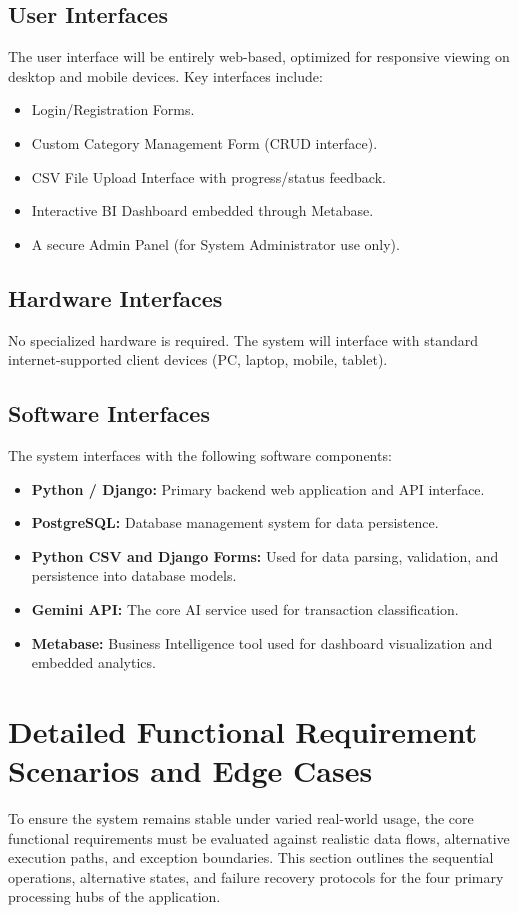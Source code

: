 \subsection{User Interfaces}
The user interface will be entirely web-based, optimized for responsive viewing on desktop and mobile devices. Key interfaces include:
\begin{itemize}
	\item Login/Registration Forms.
	\item Custom Category Management Form (CRUD interface).
	\item CSV File Upload Interface with progress/status feedback.
	\item Interactive BI Dashboard embedded through Metabase.
	\item A secure Admin Panel (for System Administrator use only).
\end{itemize}

\subsection{Hardware Interfaces}
No specialized hardware is required. The system will interface with standard internet-supported client devices (PC, laptop, mobile, tablet).

\subsection{Software Interfaces}
The system interfaces with the following software components:
\begin{itemize}
	\item \textbf{Python / Django:} Primary backend web application and API interface.
	\item \textbf{PostgreSQL:} Database management system for data persistence.
	\item \textbf{Python CSV and Django Forms:} Used for data parsing, validation, and persistence into database models.
	\item \textbf{Gemini API:} The core AI service used for transaction classification.
	\item \textbf{Metabase:} Business Intelligence tool used for dashboard visualization and embedded analytics.
\end{itemize}

\section{Detailed Functional Requirement Scenarios and Edge Cases}
To ensure the system remains stable under varied real-world usage, the core functional requirements must be evaluated against realistic data flows, alternative execution paths, and exception boundaries. This section outlines the sequential operations, alternative states, and failure recovery protocols for the four primary processing hubs of the application.

